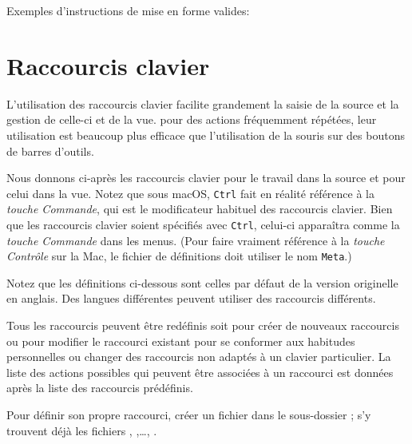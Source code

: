 Exemples d'instructions de mise en forme valides:

\section{Raccourcis clavier}
\label{sec.shortcuts}


L'utilisation des raccourcis clavier facilite grandement la saisie de la source et la gestion de celle-ci et de la vue. pour des actions fréquemment répétées, leur utilisation est beaucoup plus efficace que l'utilisation de la souris sur des boutons de barres d'outils.

Nous donnons ci-après les raccourcis clavier pour le travail dans la source et pour celui dans la vue. Notez que sous macOS, \verb|Ctrl| fait en réalité référence à la \emph{touche Commande}, qui est le modificateur habituel des raccourcis clavier. Bien que les raccourcis clavier soient spécifiés avec \verb|Ctrl|, celui-ci apparaîtra comme la \emph{touche Commande} dans les menus. (Pour faire vraiment référence à la \emph{touche Contrôle} sur la Mac, le fichier de définitions doit utiliser le nom \verb|Meta|.)

Notez que les définitions ci-dessous sont celles par défaut de la version originelle en anglais. Des langues différentes peuvent utiliser des raccourcis différents.%

Tous les raccourcis peuvent être redéfinis soit pour créer de nouveaux raccourcis ou pour modifier le raccourci existant pour se conformer aux habitudes personnelles ou changer des raccourcis non adaptés à un clavier particulier. La liste des actions possibles qui peuvent être associées à un raccourci est données après la liste des raccourcis prédéfinis.

Pour définir son propre raccourci, créer un fichier  dans le sous-dossier ; s'y trouvent déjà les fichiers , ,\dots, .


